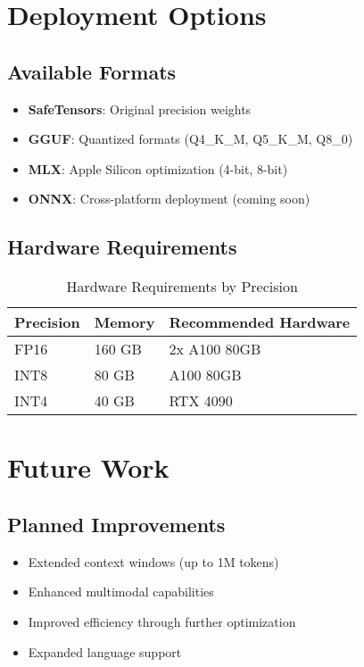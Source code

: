 \documentclass[11pt,a4paper]{article}
\begin{document}
\section{Deployment Options}

\subsection{Available Formats}
\begin{itemize}
    \item \textbf{SafeTensors}: Original precision weights
    \item \textbf{GGUF}: Quantized formats (Q4\_K\_M, Q5\_K\_M, Q8\_0)
    \item \textbf{MLX}: Apple Silicon optimization (4-bit, 8-bit)
    \item \textbf{ONNX}: Cross-platform deployment (coming soon)
\end{itemize}

\subsection{Hardware Requirements}
\begin{table}[H]
\centering
\begin{tabular}{lll}
\toprule
\textbf{Precision} & \textbf{Memory} & \textbf{Recommended Hardware} \\
\midrule
FP16 & 160 GB & 2x A100 80GB \\
INT8 & 80 GB & A100 80GB \\
INT4 & 40 GB & RTX 4090 \\
\bottomrule
\end{tabular}
\caption{Hardware Requirements by Precision}
\end{table}

\section{Future Work}

\subsection{Planned Improvements}
\begin{itemize}
    \item Extended context windows (up to 1M tokens)
    \item Enhanced multimodal capabilities
    \item Improved efficiency through further optimization
    \item Expanded language support
\end{itemize}
\end{document}
